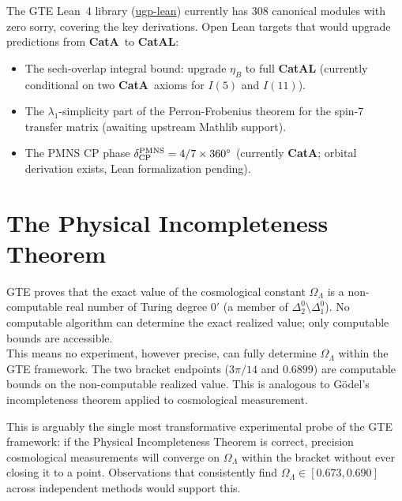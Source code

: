 \documentclass[11pt,a4paper]{article}
\newcommand{\CatAL}{\textbf{CatAL}}
\newcommand{\CatAD}{\textbf{CatAD}}
\newcommand{\CatA}{\textbf{CatA}}
\begin{document}
The GTE Lean~4 library (\href{https://github.com/novaspivack/ugp-lean}{ugp-lean})
currently has 308 canonical modules with zero sorry, covering the key derivations.
Open Lean targets that would upgrade predictions from \CatA\ to \CatAL:

\begin{itemize}[itemsep=3pt]
  \item The sech-overlap integral bound: upgrade $\eta_B$ to full \CatAL
    (currently conditional on two \CatA\ axioms for $I(5)$ and $I(11)$).
  \item The $\lambda_1$-simplicity part of the Perron-Frobenius theorem for the
    spin-7 transfer matrix (awaiting upstream Mathlib support).
  \item The PMNS CP phase $\delta_{\rm CP}^{\rm PMNS} = 4/7 \times 360^\circ$
    (currently \CatA; orbital derivation exists, Lean formalization pending).
\end{itemize}

\section{The Physical Incompleteness Theorem}
\label{sec:pit}

\begin{tcolorbox}[colback=boxred,colframe=red!60!black,
  title={Physical Incompleteness Theorem (\CatAD)}]
GTE proves that the exact value of the cosmological constant $\Omega_\Lambda$
is a non-computable real number of Turing degree $0'$ (a member of
$\Delta_2^0 \setminus \Delta_1^0$).  No computable algorithm can determine the
exact realized value; only computable bounds are accessible.\\[4pt]
This means no experiment, however precise, can fully determine $\Omega_\Lambda$
within the GTE framework.  The two bracket endpoints ($3\pi/14$ and $0.6899$)
are computable bounds on the non-computable realized value.  This is analogous
to G\"odel's incompleteness theorem applied to cosmological measurement.
\end{tcolorbox}

This is arguably the single most transformative experimental probe of the GTE
framework: if the Physical Incompleteness Theorem is correct, precision
cosmological measurements will converge on $\Omega_\Lambda$ within the bracket
without ever closing it to a point.  Observations that consistently find
$\Omega_\Lambda \in [0.673, 0.690]$ across independent methods would support this.
\end{document}
